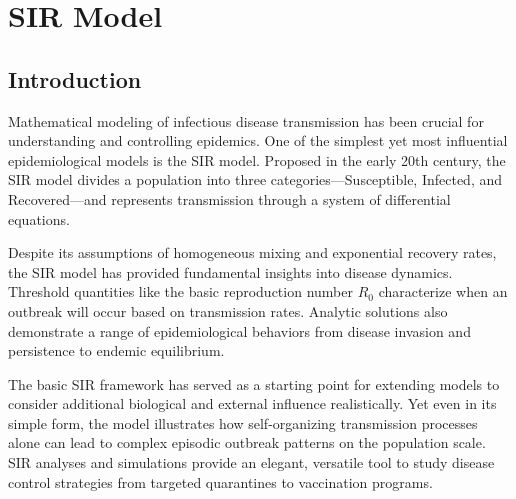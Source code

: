 \chapter{SIR Model}
\label{ch14}



\vspace{1cm}

\section{Introduction}

Mathematical modeling of infectious disease transmission has been crucial for understanding and controlling epidemics. One of the simplest yet most influential epidemiological models is the SIR model. Proposed in the early 20th century, the SIR model divides a population into three categories---Susceptible, Infected, and Recovered---and represents transmission through a system of differential equations.

Despite its assumptions of homogeneous mixing and exponential recovery rates, the SIR model has provided fundamental insights into disease dynamics. Threshold quantities like the basic reproduction number $R_0$ characterize when an outbreak will occur based on transmission rates. Analytic solutions also demonstrate a range of epidemiological behaviors from disease invasion and persistence to endemic equilibrium.

The basic SIR framework has served as a starting point for extending models to consider additional biological and external influence realistically. Yet even in its simple form, the model illustrates how self-organizing transmission processes alone can lead to complex episodic outbreak patterns on the population scale. SIR analyses and simulations provide an elegant, versatile tool to study disease control strategies from targeted quarantines to vaccination programs.


